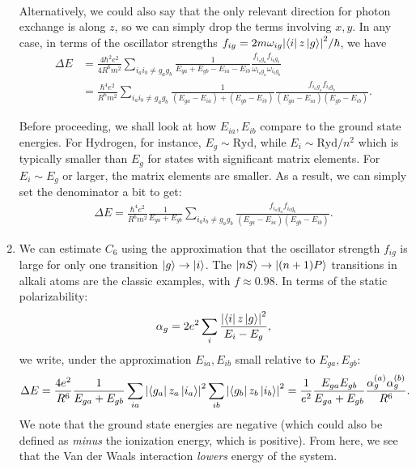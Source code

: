 \documentclass{article}
\theoremstyle{definition}
\newcommand{\al}{\alpha}
\newcommand{\f}[2]{\frac{#1}{#2}}
\begin{document}
\begin{enumerate}[label=(\alph*)]
\begin{align*}
\end{align*}
Alternatively, we could also say that the only relevant direction for photon exchange is along $z$, so we can simply drop the terms involving $x,y$. In any case, in terms of the oscillator strengths $f_{ig} = 2 m \omega_{ig} \abs{ \bra{i} z \ket{g}}^2 / \hbar $, we have
\begin{align*}
\Delta E 
&= \f{4 \hbar^2  e^2 }{4 R^6 m^2 } \sum_{i_a i_b \neq g_a g_b} 
\f{1}{E_{ga} + E_{gb} - E_{ia} - E_{ib}} \f{ f_{i_a g_a} f_{i_bg_b}}{  \omega_{i_a g_a} \omega_{i_b g_b}} \\
&= \f{\hbar^4 e^2 }{R^6 m^2} \sum_{i_a i_b \neq g_a g_b} 
\f{1}{ (E_{ga} - E_{ia}) + (E_{gb} - E_{ib})} \f{ f_{i_a g_a} f_{i_bg_b}}{  (E_{ga} - E_{ia}) (E_{gb} - E_{ib})}.
\end{align*}


Before proceeding, we shall look at how $E_{ia}, E_{ib}$ compare to the ground state energies. For Hydrogen, for instance, $E_g \sim \text{Ryd}$, while $E_i \sim \text{Ryd}/n^2$ which is typically smaller than $E_g$ for states with significant matrix elements. For $E_i \sim E_g$ or larger, the matrix elements are smaller. As a result, we can simply set the denominator a bit to get:
\begin{align*}
\Delta E = \f{\hbar^4 e^2 }{R^6 m^2} \f{1}{E_{ga} + E_{gb}} 
\sum_{i_a i_b \neq g_a g_b} 
\f{ f_{i_a g_a} f_{i_bg_b}}{  (E_{ga} - E_{ia}) (E_{gb} - E_{ib})}.
\end{align*}



\item We can estimate $C_6$ using the approximation that the oscillator strength $f_{ig}$ is large for only one transition $\ket{g} \to \ket{i}$. The $\ket{nS} \to \ket{(n+1)P}$ transitions in alkali atoms are the classic examples, with $f \approx 0.98$. In terms of the static polarizability:
\begin{align*}
\al_g = 2e^2 \sum_i \f{\abs{ \bra{i}z \ket{g} }^2}{E_i - E_g},
\end{align*}
we write, under the approximation $E_{ia}, E_{ib}$ small relative to $E_{ga}, E_{gb}$:
\begin{align*}
\Delta E 
= 
\f{ 4e^2 }{R^6} \f{1}{E_{ga} + E_{gb}} 
\sum_{ia} \abs{ \bra{g_a} z_a \ket{i_a}}^2   \sum_{ib} \abs{ \bra{g_b} z_b \ket{i_b}}^2 
=  \f{1}{e^2} \f{E_{ga}E_{gb}}{E_{ga} + E_{gb}} 
\f{\al_g^{(a)} \al_g^{(b)}}{R^6}.
\end{align*}
We note that the ground state energies are negative (which could also be defined as \textit{minus} the ionization energy, which is positive). From here, we see that the Van der Waals interaction \textit{lowers} energy of the system. 



\end{enumerate}
\end{document}
